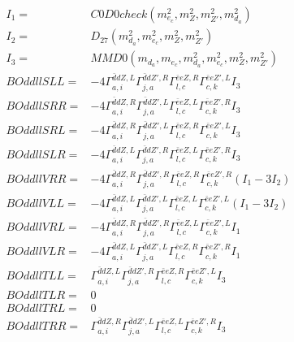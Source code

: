 \documentclass[A4,landscape]{article}
\begin{document}
\begin{align} 
I_1 = & C0D0check(m^2_{e_{{c}}}, m^2_{Z}, m^2_{{Z'}}, m^2_{d_{{a}}}) \\ 
I_2 = & D_{27}(m^2_{d_{{a}}}, m^2_{e_{{c}}}, m^2_{Z}, m^2_{{Z'}}) \\ 
I_3 = & MMD0(m_{d_{{a}}}, m_{e_{{c}}}, m^2_{d_{{a}}}, m^2_{e_{{c}}}, m^2_{Z}, m^2_{{Z'}}) \\ 
  BOddllSLL= & -4  \Gamma^{\bar{d}d Z ,L}_{a, i} \Gamma^{\bar{d}d {Z'} ,R}_{j, a} \Gamma^{\bar{e}e Z ,R}_{l, c} \Gamma^{\bar{e}e {Z'} ,L}_{c, k} I_3 \\ 
  BOddllSRR= & -4  \Gamma^{\bar{d}d Z ,R}_{a, i} \Gamma^{\bar{d}d {Z'} ,L}_{j, a} \Gamma^{\bar{e}e Z ,L}_{l, c} \Gamma^{\bar{e}e {Z'} ,R}_{c, k} I_3 \\ 
  BOddllSRL= & -4  \Gamma^{\bar{d}d Z ,R}_{a, i} \Gamma^{\bar{d}d {Z'} ,L}_{j, a} \Gamma^{\bar{e}e Z ,R}_{l, c} \Gamma^{\bar{e}e {Z'} ,L}_{c, k} I_3 \\ 
  BOddllSLR= & -4  \Gamma^{\bar{d}d Z ,L}_{a, i} \Gamma^{\bar{d}d {Z'} ,R}_{j, a} \Gamma^{\bar{e}e Z ,L}_{l, c} \Gamma^{\bar{e}e {Z'} ,R}_{c, k} I_3 \\ 
  BOddllVRR= & -4  \Gamma^{\bar{d}d Z ,R}_{a, i} \Gamma^{\bar{d}d {Z'} ,R}_{j, a} \Gamma^{\bar{e}e Z ,R}_{l, c} \Gamma^{\bar{e}e {Z'} ,R}_{c, k} (I_1 - 3 I_2) \\ 
  BOddllVLL= & -4  \Gamma^{\bar{d}d Z ,L}_{a, i} \Gamma^{\bar{d}d {Z'} ,L}_{j, a} \Gamma^{\bar{e}e Z ,L}_{l, c} \Gamma^{\bar{e}e {Z'} ,L}_{c, k} (I_1 - 3 I_2) \\ 
  BOddllVRL= & -4  \Gamma^{\bar{d}d Z ,R}_{a, i} \Gamma^{\bar{d}d {Z'} ,R}_{j, a} \Gamma^{\bar{e}e Z ,L}_{l, c} \Gamma^{\bar{e}e {Z'} ,L}_{c, k} I_1 \\ 
  BOddllVLR= & -4  \Gamma^{\bar{d}d Z ,L}_{a, i} \Gamma^{\bar{d}d {Z'} ,L}_{j, a} \Gamma^{\bar{e}e Z ,R}_{l, c} \Gamma^{\bar{e}e {Z'} ,R}_{c, k} I_1 \\ 
  BOddllTLL= &  \Gamma^{\bar{d}d Z ,L}_{a, i} \Gamma^{\bar{d}d {Z'} ,R}_{j, a} \Gamma^{\bar{e}e Z ,R}_{l, c} \Gamma^{\bar{e}e {Z'} ,L}_{c, k} I_3 \\ 
  BOddllTLR= & 0 \\ 
  BOddllTRL= & 0 \\ 
  BOddllTRR= &  \Gamma^{\bar{d}d Z ,R}_{a, i} \Gamma^{\bar{d}d {Z'} ,L}_{j, a} \Gamma^{\bar{e}e Z ,L}_{l, c} \Gamma^{\bar{e}e {Z'} ,R}_{c, k} I_3 \\ 
\end{align} 
\end{document}
